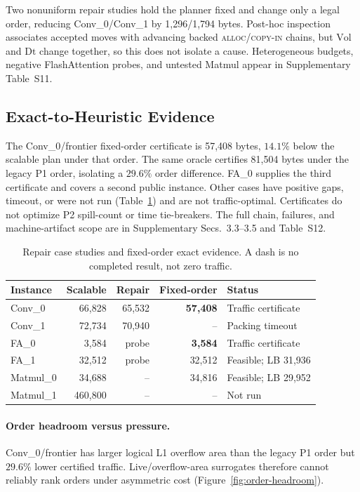 Two nonuniform repair studies hold the planner fixed and change only a legal
order, reducing Conv\_0/Conv\_1 by 1,296/1,794 bytes. Post-hoc inspection
associates accepted moves with advancing backed \textsc{alloc}/\textsc{copy-in}
chains, but $\mathrm{Vol}$ and $\mathrm{Dt}$ change together, so this does not
isolate a cause. Heterogeneous budgets, negative FlashAttention probes, and
untested Matmul appear in Supplementary Table~S11.

\subsection{Exact-to-Heuristic Evidence}\label{sec:exp-exact}

The Conv\_0/frontier fixed-order certificate is 57,408 bytes, $14.1\%$ below
the scalable plan under that order. The same oracle certifies 81,504 bytes under
the legacy P1 order, isolating a $29.6\%$ order difference. FA\_0 supplies the
third certificate and covers a second public instance. Other cases have positive
gaps, timeout, or were not run (Table~\ref{tab:exact}) and are not traffic-optimal.
Certificates do not optimize P2 spill-count or time tie-breakers. The full chain,
failures, and machine-artifact scope are in Supplementary Secs.~3.3--3.5 and
Table~S12.

\begin{table}[t]\centering\scriptsize
\caption{Repair case studies and fixed-order exact evidence. A dash is no
completed result, not zero traffic.}
\label{tab:exact}
\begin{tabularx}{\columnwidth}{lrrrX}\toprule
Instance & Scalable & Repair & Fixed-order & Status\\\midrule
Conv\_0 & 66,828 & 65,532 & \textbf{57,408} & Traffic certificate\\
Conv\_1 & 72,734 & 70,940 & -- & Packing timeout\\
FA\_0 & 3,584 & probe & \textbf{3,584} & Traffic certificate\\
FA\_1 & 32,512 & probe & 32,512 & Feasible; LB 31,936\\
Matmul\_0 & 34,688 & -- & 34,816 & Feasible; LB 29,952\\
Matmul\_1 & 460,800 & -- & -- & Not run\\\bottomrule
\end{tabularx}\end{table}

\paragraph{Order headroom versus pressure.}
Conv\_0/frontier has larger logical L1 overflow area than the legacy P1 order
but $29.6\%$ lower certified traffic. Live/overflow-area surrogates therefore
cannot reliably rank orders under asymmetric cost (Figure~\ref{fig:order-headroom}).

